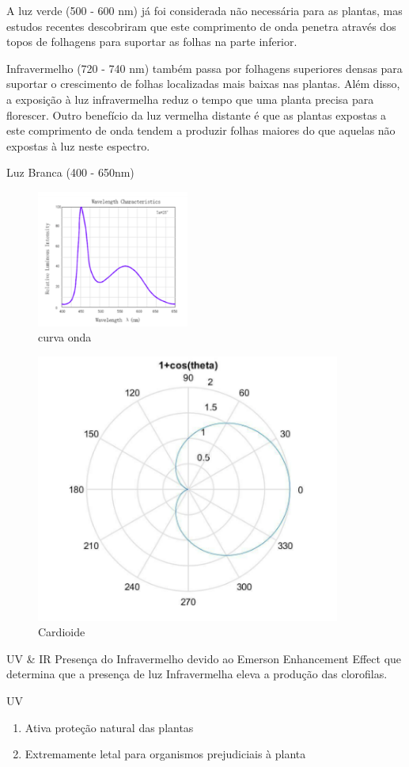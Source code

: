 A luz verde (500 - 600 nm) já foi considerada não necessária para as plantas, mas estudos recentes descobriram que este comprimento de onda penetra através dos topos de folhagens  para suportar as folhas na parte inferior.


Infravermelho (720 - 740 nm) também passa por folhagens superiores densas para suportar o crescimento de folhas localizadas mais baixas nas plantas. Além disso, a exposição à luz infravermelha reduz o tempo que uma planta precisa para florescer. Outro benefício da luz vermelha distante é que as plantas expostas a este comprimento de onda tendem a produzir folhas maiores do que aquelas não expostas à luz neste espectro.


Luz Branca (400 - 650nm)

\begin{figure}[H]
	\centering
	\includegraphics[width=5cm]{figuras/curva_onda.png}
	\caption{curva onda} \label{curva onda}
\end{figure}

\begin{figure}[H]
	\centering
	\includegraphics[width=10cm]{figuras/Cardioide.png}
	\caption{Cardioide} \label{Cardioide}
\end{figure}

UV \& IR
Presença do Infravermelho devido ao Emerson Enhancement Effect que determina que a presença de luz Infravermelha eleva a produção das clorofilas.

UV

\begin{enumerate}
	
	\item Ativa proteção natural das plantas
	\item Extremamente letal para organismos prejudiciais à planta
	
	
\end{enumerate}
